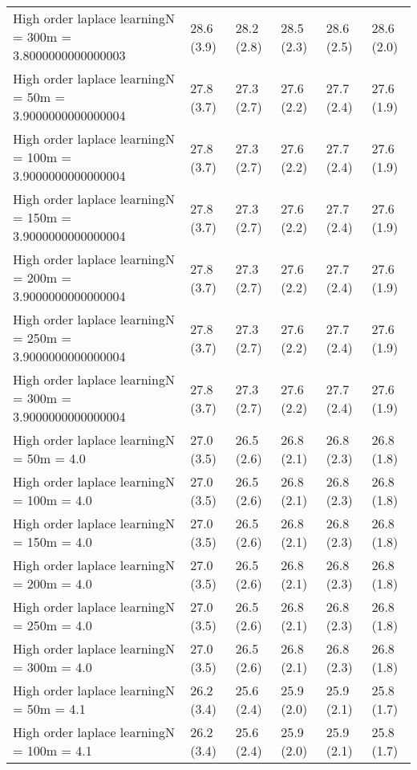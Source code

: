 \documentclass{article}
\begin{document}
\begin{table*}[t!]
\begin{center}
\begin{small}
\begin{sc}
\begin{tabular}{llllll}
High order laplace learningN = 300m = 3.8000000000000003&28.6 (3.9)      &28.2 (2.8)      &28.5 (2.3)      &28.6 (2.5)      &28.6 (2.0)      \\
High order laplace learningN = 50m = 3.9000000000000004&27.8 (3.7)      &27.3 (2.7)      &27.6 (2.2)      &27.7 (2.4)      &27.6 (1.9)      \\
High order laplace learningN = 100m = 3.9000000000000004&27.8 (3.7)      &27.3 (2.7)      &27.6 (2.2)      &27.7 (2.4)      &27.6 (1.9)      \\
High order laplace learningN = 150m = 3.9000000000000004&27.8 (3.7)      &27.3 (2.7)      &27.6 (2.2)      &27.7 (2.4)      &27.6 (1.9)      \\
High order laplace learningN = 200m = 3.9000000000000004&27.8 (3.7)      &27.3 (2.7)      &27.6 (2.2)      &27.7 (2.4)      &27.6 (1.9)      \\
High order laplace learningN = 250m = 3.9000000000000004&27.8 (3.7)      &27.3 (2.7)      &27.6 (2.2)      &27.7 (2.4)      &27.6 (1.9)      \\
High order laplace learningN = 300m = 3.9000000000000004&27.8 (3.7)      &27.3 (2.7)      &27.6 (2.2)      &27.7 (2.4)      &27.6 (1.9)      \\
High order laplace learningN = 50m = 4.0&27.0 (3.5)      &26.5 (2.6)      &26.8 (2.1)      &26.8 (2.3)      &26.8 (1.8)      \\
High order laplace learningN = 100m = 4.0&27.0 (3.5)      &26.5 (2.6)      &26.8 (2.1)      &26.8 (2.3)      &26.8 (1.8)      \\
High order laplace learningN = 150m = 4.0&27.0 (3.5)      &26.5 (2.6)      &26.8 (2.1)      &26.8 (2.3)      &26.8 (1.8)      \\
High order laplace learningN = 200m = 4.0&27.0 (3.5)      &26.5 (2.6)      &26.8 (2.1)      &26.8 (2.3)      &26.8 (1.8)      \\
High order laplace learningN = 250m = 4.0&27.0 (3.5)      &26.5 (2.6)      &26.8 (2.1)      &26.8 (2.3)      &26.8 (1.8)      \\
High order laplace learningN = 300m = 4.0&27.0 (3.5)      &26.5 (2.6)      &26.8 (2.1)      &26.8 (2.3)      &26.8 (1.8)      \\
High order laplace learningN = 50m = 4.1&26.2 (3.4)      &25.6 (2.4)      &25.9 (2.0)      &25.9 (2.1)      &25.8 (1.7)      \\
High order laplace learningN = 100m = 4.1&26.2 (3.4)      &25.6 (2.4)      &25.9 (2.0)      &25.9 (2.1)      &25.8 (1.7)      \\

\end{tabular}
\end{sc}
\end{small}
\end{center}
\end{table*}
\end{document}
